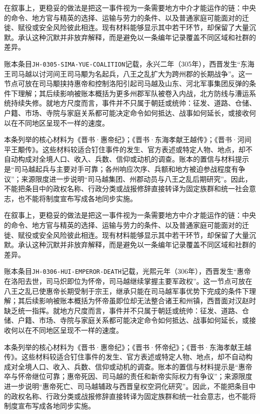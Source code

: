 在叙事上，更稳妥的做法是把这一事件视为一条需要地方中介才能运作的链：中央的命令、地方官与精英的选择、运输与劳力的条件、以及普通家庭可能面对的迁徙、赋役或安全风险彼此相连。现有材料能够显示其中若干环节，却保留了大量沉默。承认这种沉默并非放弃解释，而是避免以一条编年记录覆盖不同区域和社群的差异。

账本条目\texttt{JH-0305-SIMA-YUE-COALITION}记载，永兴二年（305年），西晋发生“东海王司马越以讨河间王司马颙为名起兵，八王之乱扩大为跨州郡的长期战争”。这一节点可放在司马颙挟持惠帝和控制洛阳引起司马越及山东、河北军事集团反弹的条件下理解；其后续影响被账本概括为更多州郡军队被卷入内战，北方防线与漕运系统持续失修。就地方尺度而言，事件并不只属于朝廷或统帅：征发、道路、仓储、户籍、市场、寺院与家庭关系都可能决定命令如何抵达、战事如何延长，或接收何以在不同地区呈现不一样的速度。

本条列举的核心材料为《晋书·惠帝纪》；《晋书·东海孝献王越传》；《晋书·河间平王颙传》。这些材料较适合钉住事件的发生、官方表述或特定人物、地点，却不自动构成对全境人口、收入、兵数、信仰或动机的调查。账本的置信与材料提示是“司马越起兵与主要对手可靠；各州响应次序、兵额和地方被迫参战程度有争议”；来源限度进一步说明“司马越集团、州郡动员与八王之乱后期研究”。因此，不能把条目中的政权名称、行政分类或战报修辞直接转译为固定族群和统一社会意志，也不能将制度宣布写成各地同步实施。

在叙事上，更稳妥的做法是把这一事件视为一条需要地方中介才能运作的链：中央的命令、地方官与精英的选择、运输与劳力的条件、以及普通家庭可能面对的迁徙、赋役或安全风险彼此相连。现有材料能够显示其中若干环节，却保留了大量沉默。承认这种沉默并非放弃解释，而是避免以一条编年记录覆盖不同区域和社群的差异。

账本条目\texttt{JH-0306-HUI-EMPEROR-DEATH}记载，光熙元年（306年），西晋发生“惠帝在洛阳去世，司马炽即位为怀帝，司马越继续掌握主要军政权”。这一节点可放在八王之乱已使惠帝长期受制于宗王，继承只能在司马越军事优势下完成的条件下理解；其后续影响被账本概括为怀帝虽即位却无法整合诸王和州镇，西晋面对汉赵时缺乏统一指挥。就地方尺度而言，事件并不只属于朝廷或统帅：征发、道路、仓储、户籍、市场、寺院与家庭关系都可能决定命令如何抵达、战事如何延长，或接收何以在不同地区呈现不一样的速度。

本条列举的核心材料为《晋书·惠帝纪》；《晋书·怀帝纪》；《晋书·东海孝献王越传》。这些材料较适合钉住事件的发生、官方表述或特定人物、地点，却不自动构成对全境人口、收入、兵数、信仰或动机的调查。账本的置信与材料提示是“惠帝卒与怀帝继位可靠；惠帝死因、司马越的责任和新帝实际权力有争议”；来源限度进一步说明“惠帝死亡、司马越辅政与西晋皇权空洞化研究”。因此，不能把条目中的政权名称、行政分类或战报修辞直接转译为固定族群和统一社会意志，也不能将制度宣布写成各地同步实施。

